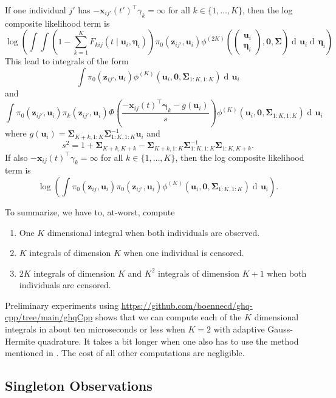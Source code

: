 \documentclass{article}
\newcommand\mat[1]{\mathbf{#1}}
\renewcommand\vec{\bm}
\newcommand\der{\operatorname{d\!}{}}
\begin{document}
If one individual $j'$ has  $-\vec x_{ij'}(t')^\top\gamma_k = \infty$ for all 
$k\in\{1,\dots,K\}$, then the log composite likelihood term is %
%
$$
\log\left(\int\int\left(1 - \sum_{k = 1}^K F_{kij}(t\mid \vec u_i, \vec\eta_i)\right)
  \pi_0(\vec z_{ij'}, \vec u_i)
   \phi^{(2K)}\left(
      \begin{pmatrix}
        \vec u_i \\ \vec\eta_i
      \end{pmatrix}, \vec 0,\mat \Sigma\right)
  \der \vec u_i\der \vec\eta_i\right) 
$$%
%
This lead to integrals of the form %
%
$$
\int \pi_0(\vec z_{ij'}, \vec u_i)\phi^{(K)}\left(
      \vec u_i, \vec 0,\mat \Sigma_{1:K,1:K}\right)
  \der \vec u_i 
$$ %
%
and%
%
$$
\int \pi_0(\vec z_{ij'}, \vec u_i)
     \pi_k(\vec z_{ij'}, \vec u_i)
	 \Phi\left(
       \frac{-\vec x_{ij}(t)^\top\vec\gamma_{k} - g(\vec u_i)}s
     \right)     
     \phi^{(K)}\left(
      \vec u_i, \vec 0,\mat \Sigma_{1:K,1:K}\right)
  \der \vec u_i 
$$%
% 
where $g(\vec u_i) = 
    \mat\Sigma_{K + k, 1:K}\mat\Sigma_{1:K, 1:K}^{-1}\vec u_i$ and%
%
$$
s^2 = 1 + \mat\Sigma_{K + k, K + k} 
  - \mat \Sigma_{K + k,1:K}\mat\Sigma_{1:K, 1:K}^{-1}\mat\Sigma_{1:K,K + k}.
$$%
%
If also  $-\vec x_{ij}(t)^\top\gamma_k = \infty$ for all $k\in\{1,\dots,K\}$, then 
the log composite likelihood term is%
%
$$
\log\left(\int
  \pi_0(\vec z_{ij}, \vec u_i)\pi_0(\vec z_{ij'}, \vec u_i)
   \phi^{(K)}\left(
      \vec u_i, \vec 0,\mat \Sigma_{1:K,1:K}\right)
  \der \vec u_i\right). 
$$

To summarize, we have to, at-worst, compute %
%
\begin{enumerate}
  \item One $K$ dimensional integral when both individuals are observed. 
  \item $K$ integrals of dimension $K$ when one individual is censored. 
  \item $2K$ integrals of dimension $K$ and $K^2$ integrals of dimension $K + 1$ when both individuals are censored. 
\end{enumerate}%
%
Preliminary experiments using 
\url{https://github.com/boennecd/ghq-cpp/tree/main/ghqCpp} shows that we 
can compute each of the $K$ dimensional integrals in about ten 
microseconds or less when $K = 2$ with adaptive Gauss-Hermite quadrature. 
It takes a bit longer when one also has to use the method mentioned 
in \cite{Genz04}. 
The cost of all other computations are negligible.

\subsection{Singleton Observations}\label{subsec:singleton}
\end{document}
